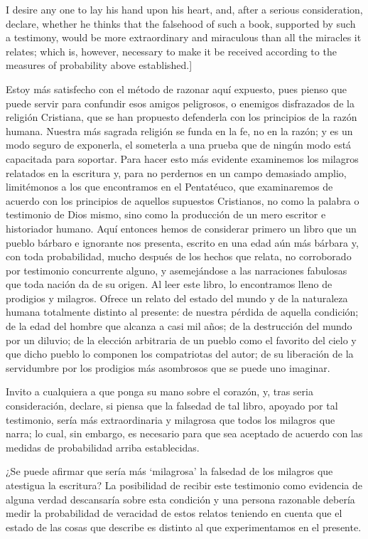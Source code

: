 I desire any one to lay his hand upon his heart, and, after a serious consideration, declare, whether he thinks that the falsehood of such a book, supported by such a testimony, would be more extraordinary and miraculous than all the miracles it relates; which is, however, necessary to make it be received according to the measures of probability above established.]{Estoy más satisfecho con el método de razonar aquí expuesto, pues pienso que puede servir para confundir esos amigos peligrosos, o enemigos disfrazados de la religión Cristiana, que se han propuesto defenderla con los principios de la razón humana. Nuestra más sagrada religión se funda en la fe, no en la razón; y es un modo seguro de exponerla, el someterla a una prueba que de ningún modo está capacitada para soportar. Para hacer esto más evidente examinemos los milagros relatados en la escritura y, para no perdernos en un campo demasiado amplio, limitémonos a los que encontramos en el Pentatéuco, que examinaremos de acuerdo con los principios de aquellos supuestos Cristianos, no como la palabra o testimonio de Dios mismo, sino como la producción de un mero escritor e historiador humano. Aquí entonces hemos de considerar primero un libro que un pueblo bárbaro e ignorante nos presenta, escrito en una edad aún más bárbara y, con toda probabilidad, mucho después de los hechos que relata, no corroborado por testimonio concurrente alguno, y asemejándose a las narraciones fabulosas que toda nación da de su origen. Al leer este libro, lo encontramos lleno de prodigios y milagros. Ofrece un relato del estado del mundo y de la naturaleza humana totalmente distinto al presente: de nuestra pérdida de aquella condición; de la edad del hombre que alcanza a casi mil años; de la destrucción del mundo por un diluvio; de la elección arbitraria de un pueblo como el favorito del cielo y que dicho pueblo lo componen los compatriotas del autor; de su liberación de la servidumbre por los prodigios más asombrosos que se puede uno imaginar.

Invito a cualquiera a que ponga su mano sobre el corazón, y, tras seria consideración, declare, si piensa que la falsedad de tal libro, apoyado por tal testimonio, sería más extraordinaria y milagrosa que todos los milagros que narra; lo cual, sin embargo, es necesario para que sea aceptado de acuerdo con las medidas de probabilidad arriba establecidas.}

¿Se puede afirmar que sería más `milagrosa' la falsedad de los milagros que atestigua la escritura? La posibilidad de recibir este testimonio como evidencia de alguna verdad descansaría sobre esta condición y una persona razonable debería medir la probabilidad de veracidad de estos relatos teniendo en cuenta que el estado de las cosas que describe es distinto al que experimentamos en el presente.

